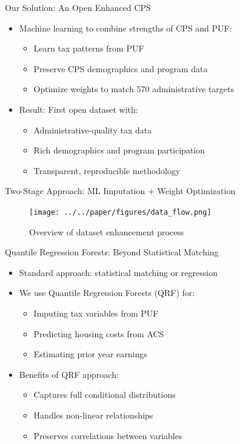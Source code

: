 \documentclass{beamer}
\begin{document}
\begin{frame}{Our Solution: An Open Enhanced CPS}
    \begin{itemize}
        \item Machine learning to combine strengths of CPS and PUF:
        \begin{itemize}
            \item Learn tax patterns from PUF
            \item Preserve CPS demographics and program data
            \item Optimize weights to match 570 administrative targets
        \end{itemize}
        \pause
        \item Result: First open dataset with:
        \begin{itemize}
            \item Administrative-quality tax data
            \item Rich demographics and program participation
            \item Transparent, reproducible methodology
        \end{itemize}
    \end{itemize}
\end{frame}

\begin{frame}{Two-Stage Approach: ML Imputation + Weight Optimization}
    \begin{figure}
        \centering
        \texttt{[image: ../../paper/figures/data\_flow.png]}
        \caption{Overview of dataset enhancement process}
    \end{figure}
\end{frame}

\begin{frame}{Quantile Regression Forests: Beyond Statistical Matching}
    \begin{itemize}
        \item Standard approach: statistical matching or regression
        \item We use Quantile Regression Forests (QRF) for:
        \begin{itemize}
            \item Imputing tax variables from PUF
            \item Predicting housing costs from ACS
            \item Estimating prior year earnings
        \end{itemize}
        \item Benefits of QRF approach:
        \begin{itemize}
            \item Captures full conditional distributions
            \item Handles non-linear relationships
            \item Preserves correlations between variables
        \end{itemize}
    \end{itemize}
\end{frame}
\end{document}
